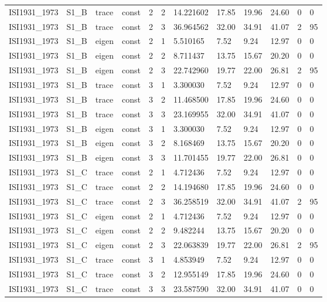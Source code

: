 \begin{tabular}{llllllllllll}
ISI1931\_1973 & S1\_B & trace & const & 2 & 2 & 14.221602 & 17.85 & 19.96 & 24.60 & 0 & 0 \\
ISI1931\_1973 & S1\_B & trace & const & 2 & 3 & 36.964562 & 32.00 & 34.91 & 41.07 & 2 & 95 \\
ISI1931\_1973 & S1\_B & eigen & const & 2 & 1 & 5.510165 & 7.52 & 9.24 & 12.97 & 0 & 0 \\
ISI1931\_1973 & S1\_B & eigen & const & 2 & 2 & 8.711437 & 13.75 & 15.67 & 20.20 & 0 & 0 \\
ISI1931\_1973 & S1\_B & eigen & const & 2 & 3 & 22.742960 & 19.77 & 22.00 & 26.81 & 2 & 95 \\
ISI1931\_1973 & S1\_B & trace & const & 3 & 1 & 3.300030 & 7.52 & 9.24 & 12.97 & 0 & 0 \\
ISI1931\_1973 & S1\_B & trace & const & 3 & 2 & 11.468500 & 17.85 & 19.96 & 24.60 & 0 & 0 \\
ISI1931\_1973 & S1\_B & trace & const & 3 & 3 & 23.169955 & 32.00 & 34.91 & 41.07 & 0 & 0 \\
ISI1931\_1973 & S1\_B & eigen & const & 3 & 1 & 3.300030 & 7.52 & 9.24 & 12.97 & 0 & 0 \\
ISI1931\_1973 & S1\_B & eigen & const & 3 & 2 & 8.168469 & 13.75 & 15.67 & 20.20 & 0 & 0 \\
ISI1931\_1973 & S1\_B & eigen & const & 3 & 3 & 11.701455 & 19.77 & 22.00 & 26.81 & 0 & 0 \\
ISI1931\_1973 & S1\_C & trace & const & 2 & 1 & 4.712436 & 7.52 & 9.24 & 12.97 & 0 & 0 \\
ISI1931\_1973 & S1\_C & trace & const & 2 & 2 & 14.194680 & 17.85 & 19.96 & 24.60 & 0 & 0 \\
ISI1931\_1973 & S1\_C & trace & const & 2 & 3 & 36.258519 & 32.00 & 34.91 & 41.07 & 2 & 95 \\
ISI1931\_1973 & S1\_C & eigen & const & 2 & 1 & 4.712436 & 7.52 & 9.24 & 12.97 & 0 & 0 \\
ISI1931\_1973 & S1\_C & eigen & const & 2 & 2 & 9.482244 & 13.75 & 15.67 & 20.20 & 0 & 0 \\
ISI1931\_1973 & S1\_C & eigen & const & 2 & 3 & 22.063839 & 19.77 & 22.00 & 26.81 & 2 & 95 \\
ISI1931\_1973 & S1\_C & trace & const & 3 & 1 & 4.853949 & 7.52 & 9.24 & 12.97 & 0 & 0 \\
ISI1931\_1973 & S1\_C & trace & const & 3 & 2 & 12.955149 & 17.85 & 19.96 & 24.60 & 0 & 0 \\
ISI1931\_1973 & S1\_C & trace & const & 3 & 3 & 23.587590 & 32.00 & 34.91 & 41.07 & 0 & 0 \\

\end{tabular}

